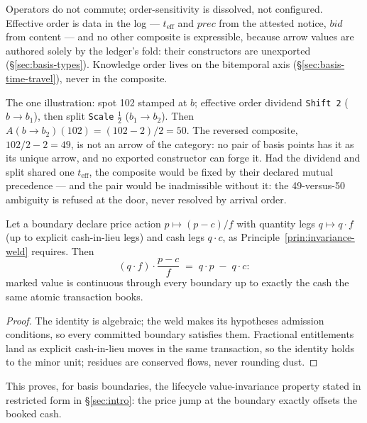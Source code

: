 Operators do not commute; order-sensitivity is dissolved, not configured. Effective
order is data in the log --- $t_{\mathrm{eff}}$ and $\mathit{prec}$ from the attested
notice, $\mathit{bid}$ from content --- and no other composite is expressible, because
arrow values are authored solely by the ledger's fold: their constructors are unexported
(\S\ref{sec:basis-types}). Knowledge order lives on the bitemporal axis
(\S\ref{sec:basis-time-travel}), never in the composite.

The one illustration: spot 102 stamped at $b$; effective order dividend
\texttt{Shift 2} ($b\to b_1$), then split \texttt{Scale} $\tfrac12$ ($b_1\to b_2$).
Then $A(b\to b_2)(102)=(102-2)/2=50$. The reversed composite, $102/2-2=49$, is not an
arrow of the category: no pair of basis points has it as its unique arrow, and no
exported constructor can forge it. Had the dividend and split shared one
$t_{\mathrm{eff}}$, the composite would be fixed by their declared mutual precedence ---
and the pair would be inadmissible without it: the 49-versus-50 ambiguity is refused at
the door, never resolved by arrival order.

\begin{theorem}
\label{thm:basis-value-invariance}
Let a boundary declare price action $p\mapsto(p-c)/f$ with quantity legs
$q\mapsto q\cdot f$ (up to explicit cash-in-lieu legs) and cash legs $q\cdot c$, as
Principle~\ref{prin:invariance-weld} requires. Then
\[
(q\cdot f)\cdot\frac{p-c}{f} \;=\; q\cdot p \;-\; q\cdot c :
\]
marked value is continuous through every boundary up to exactly the cash the same atomic
transaction books.
\end{theorem}

\begin{proof}
The identity is algebraic; the weld makes its hypotheses admission conditions, so every
committed boundary satisfies them. Fractional entitlements land as explicit cash-in-lieu
moves in the same transaction, so the identity holds to the minor unit; residues are
conserved flows, never rounding dust.
\end{proof}

\noindent
This proves, for basis boundaries, the lifecycle value-invariance property stated in
restricted form in \S\ref{sec:intro}: the price jump at the boundary exactly offsets the
booked cash.

